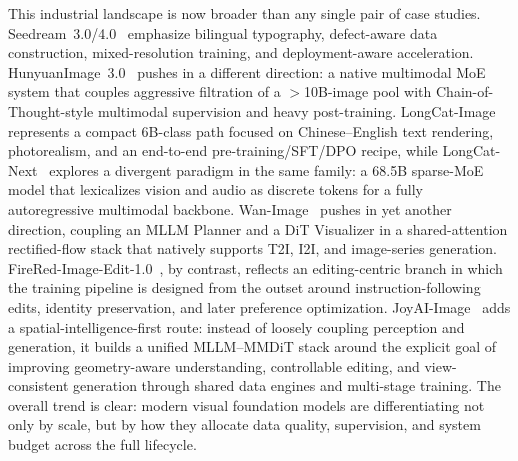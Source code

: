 This industrial landscape is now broader than any single pair of case studies. Seedream~3.0/4.0~\citep{gao2025seedream,seedream2025seedream} emphasize bilingual typography, defect-aware data construction, mixed-resolution training, and deployment-aware acceleration. HunyuanImage~3.0~\citep{cao2025hunyuanimage} pushes in a different direction: a native multimodal MoE system that couples aggressive filtration of a $>$10B-image pool with Chain-of-Thought-style multimodal supervision and heavy post-training. LongCat-Image~\citep{team2025longcat} represents a compact 6B-class path focused on Chinese--English text rendering, photorealism, and an end-to-end pre-training/SFT/DPO recipe, while LongCat-Next~\citep{team2026longcat} explores a divergent paradigm in the same family: a 68.5B sparse-MoE model that lexicalizes vision and audio as discrete tokens for a fully autoregressive multimodal backbone. Wan-Image~\citep{mao2026wan} pushes in yet another direction, coupling an MLLM Planner and a DiT Visualizer in a shared-attention rectified-flow stack that natively supports T2I, I2I, and image-series generation. FireRed-Image-Edit-1.0~\citep{team2026firered}, by contrast, reflects an editing-centric branch in which the training pipeline is designed from the outset around instruction-following edits, identity preservation, and later preference optimization. JoyAI-Image~\citep{jdjoyaiimage} adds a spatial-intelligence-first route: instead of loosely coupling perception and generation, it builds a unified MLLM--MMDiT stack around the explicit goal of improving geometry-aware understanding, controllable editing, and view-consistent generation through shared data engines and multi-stage training. The overall trend is clear: modern visual foundation models are differentiating not only by scale, but by how they allocate data quality, supervision, and system budget across the full lifecycle.

